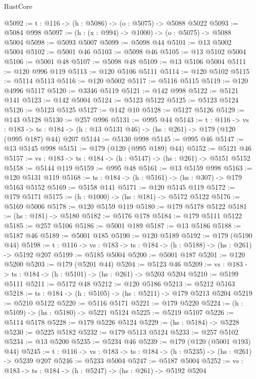 \begin{lexlean}{RustCore}
\begin{coremodule}
@5092 := {t : @116} -> (h : @5086) -> (o : @5075) -> @5088 @5022
@5093 := @5084 @998
@5097 := (h : (x : @994) -> @1000) -> (o : @5075) -> @5088 @5004
@5098 := @5093 @5007
@5099 := @5098 @44
@5101 := @13 @5002 @5004
@5102 := @5001 @46
@5103 := @5098 @46
@5105 := @13 @5102 @5004
@5106 := @5001 @48
@5107 := @5098 @48
@5109 := @13 @5106 @5004
@5111 := @120 @996 @119
@5113 := @120 @5106 @5111
@5114 := @120 @5102
@5115 := @5114 @5113
@5116 := @120 @5002
@5117 := @5116 @5115
@5119 := @120 @4996 @5117
@5120 := @3346 @5119
@5121 := @142 @998
@5122 := @5121 @141
@5123 := @142 @5004
@5124 := @5123 @5122
@5125 := @5123 @5124
@5126 := @5123 @5125
@5127 := @142 @10
@5128 := @5127 @5126
@5129 := @143 @5128
@5130 := @257 @996
@5131 := @995 @44
@5143 := {t : @116} ->
  {vs : @183} ->
  {ts : @184} -> (h : @13 @5131 @46) -> (hs : @261) -> @179 (@120 (@995 @187) @44) @207
@5144 := @5130 @998
@5145 := @995 @46
@5147 := @13 @5145 @998
@5151 := @179 (@120 (@995 @189) @44)
@5152 := @5121 @46
@5157 := {vs : @183} -> {ts : @184} -> (h : @5147) -> (hs : @261) -> @5151 @5152
@5158 := @5144 @119
@5159 := @995 @48
@5161 := @13 @5159 @998
@5163 := @120 @5131 @119
@5168 := {ts : @184} -> (h : @5161) -> (hs : @307) -> @179 @5163 @5152
@5169 := @5158 @141
@5171 := @120 @5145 @119
@5172 := @179 @5171
@5175 := (h : @1000) -> (hs : @181) -> @5172 @5122
@5176 := @5169 @5006
@5178 := @120 @5159 @119
@5180 := @179 @5178 @5122
@5181 := (hs : @181) -> @5180
@5182 := @5176 @178
@5184 := @179 @5111 @5122
@5185 := @257 @5106
@5186 := @5001 @189
@5187 := @13 @5186
@5188 := @5187 @46
@5189 := @5001 @185
@5190 := @120 @5189
@5192 := @179 (@5190 @44)
@5198 := {t : @116} -> {vs : @183} -> {ts : @184} -> (h : @5188) -> (hs : @261) -> @5192 @207
@5199 := @5185 @5004
@5200 := @5001 @187
@5201 := @120 @5200
@5203 := @179 (@5201 @44)
@5204 := @5123 @46
@5209 := {vs : @183} -> {ts : @184} -> (h : @5101) -> (hs : @261) -> @5203 @5204
@5210 := @5199 @5111
@5211 := @5172 @48
@5212 := @120 @5186
@5213 := @5212 @5163
@5218 := {ts : @184} -> (h : @5105) -> (hs : @5211) -> @179 @5213 @5204
@5219 := @5210 @5122
@5220 := @5116 @5171
@5221 := @179 @5220
@5224 := (h : @5109) -> (hs : @5180) -> @5221 @5124
@5225 := @5219 @5107
@5226 := @5114 @5178
@5228 := @179 @5226 @5124
@5229 := (hs : @5184) -> @5228
@5230 := @5225 @5182
@5232 := @179 @5113 @5124
@5233 := @257 @5102
@5234 := @13 @5200
@5235 := @5234 @46
@5239 := @179 (@120 (@5001 @193) @44)
@5245 := {t : @116} -> {vs : @183} -> {ts : @184} -> (h : @5235) -> (hs : @261) -> @5239 @207
@5246 := @5233 @5004
@5247 := @5187 @5004
@5252 := {vs : @183} -> {ts : @184} -> (h : @5247) -> (hs : @261) -> @5192 @5204

\end{coremodule}
\end{lexlean}
